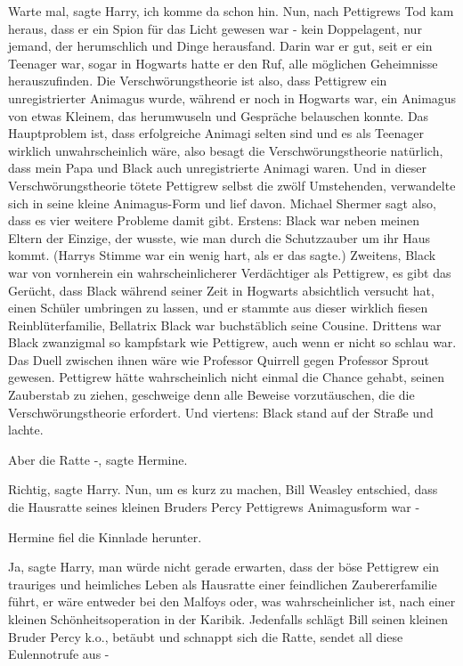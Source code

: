 \glqq{}Warte mal\grqq{}, sagte Harry, \glqq{}ich komme da schon hin. Nun, nach
Pettigrews Tod kam heraus, dass er ein Spion für das Licht gewesen war - kein
Doppelagent, nur jemand, der herumschlich und Dinge herausfand. Darin war er
gut, seit er ein Teenager war, sogar in Hogwarts hatte er den Ruf, alle
möglichen Geheimnisse herauszufinden. Die Verschwörungstheorie ist also, dass
Pettigrew ein unregistrierter Animagus wurde, während er noch in Hogwarts war,
ein Animagus von etwas Kleinem, das herumwuseln und Gespräche belauschen konnte.
Das Hauptproblem ist, dass erfolgreiche Animagi selten sind und es als Teenager
wirklich unwahrscheinlich wäre, also besagt die Verschwörungstheorie natürlich,
dass mein Papa und Black auch unregistrierte Animagi waren. Und in dieser
Verschwörungstheorie tötete Pettigrew selbst die zwölf Umstehenden, verwandelte
sich in seine kleine Animagus-Form und lief davon. Michael Shermer sagt also,
dass es vier weitere Probleme damit gibt. Erstens: Black war neben meinen Eltern
der Einzige, der wusste, wie man durch die Schutzzauber um ihr Haus
kommt.\grqq{} (Harrys Stimme war ein wenig hart, als er das sagte.)
\glqq{}Zweitens, Black war von vornherein ein wahrscheinlicherer Verdächtiger
als Pettigrew, es gibt das Gerücht, dass Black während seiner Zeit in Hogwarts
absichtlich versucht hat, einen Schüler umbringen zu lassen, und er stammte aus
dieser wirklich fiesen Reinblüterfamilie, Bellatrix Black war buchstäblich seine
Cousine. Drittens war Black zwanzigmal so kampfstark wie Pettigrew, auch wenn er
nicht so schlau war. Das Duell zwischen ihnen wäre wie Professor Quirrell gegen
Professor Sprout gewesen. Pettigrew hätte wahrscheinlich nicht einmal die Chance
gehabt, seinen Zauberstab zu ziehen, geschweige denn alle Beweise vorzutäuschen,
die die Verschwörungstheorie erfordert. Und viertens: Black stand auf der Straße
und lachte.\grqq{}

\glqq{}Aber die Ratte -\grqq{}, sagte Hermine.

\glqq{}Richtig\grqq{}, sagte Harry. \glqq{}Nun, um es kurz zu machen, Bill
Weasley entschied, dass die Hausratte seines kleinen Bruders Percy Pettigrews
Animagusform war -\grqq{}

Hermine fiel die Kinnlade herunter.

\glqq{}Ja\grqq{}, sagte Harry, \glqq{}man würde nicht gerade erwarten, dass der
böse Pettigrew ein trauriges und heimliches Leben als Hausratte einer
feindlichen Zaubererfamilie führt, er wäre entweder bei den Malfoys oder, was
wahrscheinlicher ist, nach einer kleinen Schönheitsoperation in der Karibik.
Jedenfalls schlägt Bill seinen kleinen Bruder Percy k.o., betäubt und schnappt
sich die Ratte, sendet all diese Eulennotrufe aus -\grqq{}

